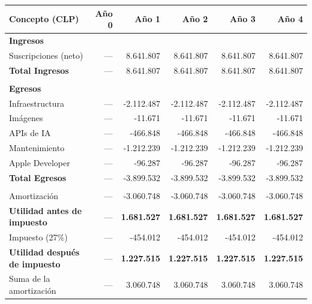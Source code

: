 \begin{table}[h!]
    \centering
    \renewcommand{\arraystretch}{1.3}
    \footnotesize
    \begin{tabular}{|m{3.2cm}|r|r|r|r|r|}
        \hline
        \rowcolor[HTML]{EFEFEF}
        \textbf{Concepto (CLP)} & \textbf{Año 0} & \textbf{Año 1} & \textbf{Año 2} & \textbf{Año 3} & \textbf{Año 4} \\ \hline
        
        \textbf{Ingresos } &&&&&\\ \hline
        Suscripciones (neto) & --- & 8.641.807 & 8.641.807 & 8.641.807 & 8.641.807 \\ \hline
        \rowcolor[HTML]{E8F5E9}
        \textbf{Total Ingresos} & --- & 8.641.807 & 8.641.807 & 8.641.807 & 8.641.807 \\ \hline
        & & & & & \\ \hline
        \textbf{Egresos} & & & & & \\ \hline
        Infraestructura & --- & -2.112.487 & -2.112.487 & -2.112.487 & -2.112.487 \\ \hline
        Imágenes & --- & -11.671 & -11.671 & -11.671 & -11.671 \\ \hline
        APIs de IA & --- & -466.848 & -466.848 & -466.848 & -466.848 \\ \hline
        Mantenimiento & --- & -1.212.239 & -1.212.239 & -1.212.239 & -1.212.239 \\ \hline
        Apple Developer & --- & -96.287 & -96.287 & -96.287 & -96.287 \\ \hline
        \rowcolor[HTML]{F3E5F5}
        \textbf{Total Egresos} & --- & -3.899.532 & -3.899.532 & -3.899.532 & -3.899.532 \\ \hline
        & & & & & \\ \hline
        Amortización & --- & -3.060.748 & -3.060.748 & -3.060.748 & -3.060.748 \\ \hline
        \textbf{Utilidad antes de impuesto} & --- & \textbf{1.681.527} & \textbf{1.681.527} & \textbf{1.681.527} & \textbf{1.681.527} \\ \hline
        Impuesto (27\%) & --- & -454.012 & -454.012 & -454.012 & -454.012 \\ \hline
        \textbf{Utilidad después de impuesto} & --- & \textbf{1.227.515} & \textbf{1.227.515} & \textbf{1.227.515} & \textbf{1.227.515} \\ \hline
        Suma de la amortización & --- & 3.060.748 & 3.060.748 & 3.060.748 & 3.060.748 \\ \hline

\end{tabular}
\end{table}
